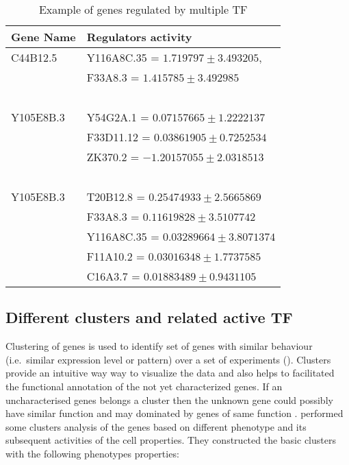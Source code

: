 \begin{table}
	\centering
\begin{tabular}{l l }
      \toprule
      \textbf{Gene Name} & \textbf{Regulators activity} \\
      \midrule
	      C44B12.5 & Y116A8C.35 = $ 1.719797 \pm 3.493205 $, \\ 
		       & F33A8.3 = $ 1.415785 \pm 3.492985$ \\~\\

	      Y105E8B.3 & Y54G2A.1 = $ 0.07157665 \pm 1.2222137 $ \\
			& F33D11.12 = $ 0.03861905 \pm 0.7252534 $ \\
			& ZK370.2 = $ -1.20157055 \pm  2.0318513 $\\~\\
		    
	      Y105E8B.3 & T20B12.8 = $ 0.25474933 \pm  2.5665869 $ \\
		  	& F33A8.3 = $ 0.11619828  \pm  3.5107742 $ \\
 		  	& Y116A8C.35 = $ 0.03289664 \pm  3.8071374 $ \\
			& F11A10.2 = $ 0.03016348 \pm 1.7737585 $ \\
 		  	& C16A3.7 = $ 0.01883489 \pm  0.9431105$\\
  \bottomrule
  \end{tabular}
	  \caption[Example of genes regulated by multiple TF]
		  {Example of genes regulated by multiple TF}
	  \label{table:Genes_regulated_by_multiple_TF}
\end{table}

\subsection{Different clusters and related active TF}
Clustering of genes is used to identify set of genes with similar behaviour (i.e.\ similar expression level or pattern) over a set of experiments (\cite{Eisen:1998}). Clusters provide an intuitive way way to visualize the data and also helps to facilitated the functional annotation of the not yet characterized genes. If an uncharacterised genes belongs a cluster then the unknown gene could possibly have similar function and may dominated by genes of same function \cite{Pe'er:2003}. \cite{Cossins:2007} performed some clusters analysis of the genes based on different phenotype and its subsequent activities of the cell properties. They constructed the basic clusters with the following phenotypes properties:


